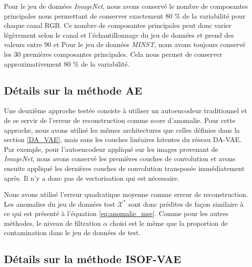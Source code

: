 Pour le jeu de données \textit{ImageNet}, nous avons conservé le nombre de composantes principales nous permettant de conserver exactement 80 \% de la variabilité pour chaque canal RGB. Ce nombre de composantes principales peut donc varier légèrement selon le canal et l'échantillonnage du jeu de données et prend des valeurs entre 90 et \DIFdelbegin {}\DIFdelend \DIFaddbegin {}\DIFaddend Pour le jeu de données \textit{MINST}, nous avons toujours conservé les 30 premières composantes principales. Cela nous permet de conserver approximativement  80 \% de la variabilité. 

\subsection{Détails sur la méthode AE} \label{AE}

Une deuxième approche testée consiste à utiliser un autoencodeur traditionnel et de se servir de l'erreur de reconstruction comme score d'anomalie. Pour cette approche, nous avons utilisé les mêmes architectures que celles définies dans la section \ref{DA_VAE}, mais sans les couches linéaires latentes du réseau DA-VAE. Par exemple, pour l'autoencodeur appliqué sur les images provenant de \textit{ImageNet}, nous avons conservé les \DIFdelbegin {}\DIFdelend \DIFaddbegin {}\DIFaddend premières couches de convolution et avons ensuite appliqué les \DIFdelbegin {}\DIFdelend \DIFaddbegin {}\DIFaddend dernières couches de convolution transposée immédiatement après. Il n'y a donc pas de vectorisation qui est nécessaire. 

Nous avons utilisé l'erreur quadratique moyenne comme erreur de reconstruction. Les anomalies du jeu de données test $\mathcal{X^*}$ sont donc prédites de façon similaire à ce qui est présenté à l'équation \ref{eq:anomalie_mse}. Comme pour les autres méthodes, le niveau de filtration $\alpha$ choisi est le même que la proportion de contamination dans le jeu de données de test. 

\subsection{Détails sur la méthode ISOF-VAE} \label{isof_vae}


